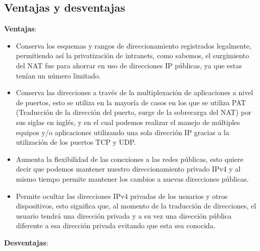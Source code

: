 \documentclass[
	12pt, %
	fleqn, %
	a4paper, %
	oneside, %
]{LegrandOrangeBook}
\begin{document}
\subsection{Ventajas y desventajas}
\textbf{Ventajas}:
\begin{itemize}
\item Conserva los esquemas y rangos de direccionamiento registrados legalmente, permitiendo así la privatización de intranets, como sabemos, el surgimiento del NAT fue para ahorrar en uso de direcciones IP públicas, ya que estas tenían un número limitado.
\item Conserva las direcciones a través de la multiplexación de aplicaciones a nivel de puertos, esto se utiliza en la mayoría de casos en los que se utiliza PAT (Traducción de la dirección del puerto, surge de la sobrecarga del NAT) por sus siglas en inglés, y en el cual podemos realizar el manejo de múltiples equipos y/o aplicaciones utilizando una sola dirección IP gracias a la utilización de los puertos TCP y UDP.
\item Aumenta la flexibilidad de las conexiones a las redes públicas, esto quiere decir que podemos mantener nuestro direccionamiento privado IPv4 y al mismo tiempo permite mantener los cambios a nuevas direcciones públicas.
\item Permite ocultar las direcciones IPv4 privadas de los usuarios y otros dispositivos, esto significa que, al momento de la traducción de direcciones, el usuario tendrá una dirección privada y a su vez una dirección pública diferente a esa dirección privada evitando que esta sea conocida.
\end{itemize}
\textbf{Desventajas}:
\end{document}
